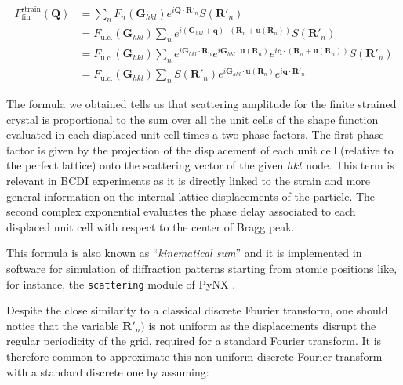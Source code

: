 \begin{equation}
    \begin{aligned}
        F^{\text{strain}}_{\text{fin}}(\mathbf{Q}) &= 
        \sum_{n} F_n(\mathbf{G}_{hkl}) e^{i \mathbf{Q} \cdot \mathbf{R}'_n} S(\mathbf{R}'_n) \\
        &= F_{\text{u.c.}}(\mathbf{G}_{hkl}) \sum_{n}  e^{i (\mathbf{G}_{hkl} + \mathbf{q}) \cdot  (\mathbf{R}_n + \mathbf{u}(\mathbf{R}_n)) } S(\mathbf{R}'_n) \\
        &= F_{\text{u.c.}}(\mathbf{G}_{hkl}) \sum_{n}  e^{i \mathbf{G}_{hkl}\cdot  \mathbf{R}_n} e^{i \mathbf{G}_{hkl} \cdot  \mathbf{u}(\mathbf{R}_n) } e^{i \mathbf{q} \cdot  (\mathbf{R}_n + \mathbf{u}(\mathbf{R}_n)) } S(\mathbf{R}'_n) \\
        &= F_{\text{u.c.}}(\mathbf{G}_{hkl}) \sum_{n} S(\mathbf{R}'_n) e^{i \mathbf{G}_{hkl} \cdot  \mathbf{u}(\mathbf{R}_n) } e^{i \mathbf{q} \cdot  \mathbf{R}'_n }
    \end{aligned}
    \label{eq:strain_fin4}
\end{equation}

The formula we obtained tells us that scattering amplitude for the finite strained crystal is proportional to the 
sum over all the unit cells of the shape function evaluated in each displaced unit cell times a two phase factors. 
The first phase factor is given by the projection of the displacement of each unit cell (relative to the perfect lattice) 
onto the scattering vector of the given $hkl$ node.  This term is relevant in BCDI experiments as it is directly linked to 
the strain and more general information on the internal lattice displacements of the particle. 
The second complex exponential evaluates the phase delay associated to each displaced unit cell with respect to the 
center of Bragg peak. 

This formula is also known as ``\textit{kinematical sum}'' and it is implemented in software for simulation of diffraction 
patterns starting from atomic positions like, for instance, the \texttt{scattering} module of PyNX \cite{pynx_scattering}. 

Despite the close similarity to a classical discrete Fourier transform, one should notice that the variable $\mathbf{R}'_n)$ 
is not uniform as the displacements disrupt the regular periodicity of the grid, required for a standard Fourier transform. 
It is therefore common to approximate this non-uniform discrete Fourier transform with a standard discrete one by assuming: 

